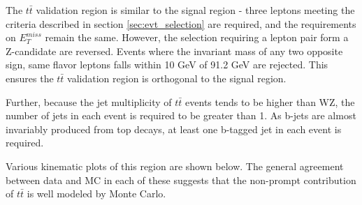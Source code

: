 The $t\bar{t}$ validation region is similar to the signal region - three leptons meeting the criteria described in section \ref{sec:evt_selection} are required, and the requirements on $E_T^{miss}$ remain the same. However, the selection requiring a lepton pair form a Z-candidate are reversed. Events where the invariant mass of any two opposite sign, same flavor leptons falls within 10 GeV of 91.2 GeV are rejected. This ensures the $t\bar{t}$ validation region is orthogonal to the signal region. 

Further, because the jet multiplicity of $t\bar{t}$ events tends to be higher than WZ, the number of jets in each event is required to be greater than 1. As b-jets are almost invariably produced from top decays, at least one b-tagged jet in each event is required. 



Various kinematic plots of this region are shown below. The general agreement between data and MC in each of these suggests that the non-prompt contribution of $t\bar{t}$ is well modeled by Monte Carlo.

